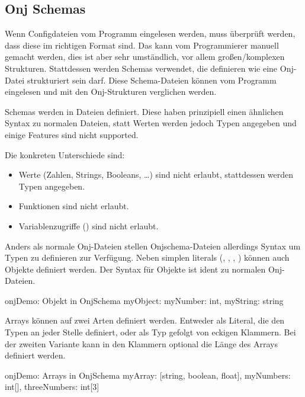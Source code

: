 
\subsection{Onj Schemas}\label{subsec:onj-schemas}

\renewcommand{\kapitelautor}{Autor: Marvin Kurka}

Wenn Configdateien vom Programm eingelesen werden, muss überprüft werden, dass diese im richtigen Format sind.
Das kann vom Programmierer manuell gemacht werden, dies ist aber sehr umständlich, vor allem großen/komplexen Strukturen.
Stattdessen werden Schemas verwendet, die definieren wie eine Onj-Datei strukturiert sein darf.
Diese Schema-Dateien können vom Programm eingelesen und mit den Onj-Strukturen verglichen werden.

Schemas werden in  Dateien definiert.
Diese haben prinzipiell einen ähnlichen Syntax zu normalen  Dateien, statt Werten werden jedoch
Typen angegeben und einige Features sind nicht supported.

Die konkreten Unterschiede sind:
\begin{itemize}
    \item Werte (\zB Zahlen, Strings, Booleans, \ldots) sind nicht erlaubt, stattdessen werden Typen angegeben.
    \item Funktionen sind nicht erlaubt.
    \item Variablenzugriffe () sind nicht erlaubt.
\end{itemize}

Anders als normale Onj-Dateien stellen Onjschema-Dateien allerdings Syntax um Typen zu definieren zur Verfügung.
Neben simplen literals (, , , ) können auch
Objekte definiert werden.
Der Syntax für Objekte ist ident zu normalen Onj-Dateien.

\begin{codeBlock}{onj}{Demo: Objekt in OnjSchema}
myObject: {
    myNumber: int,
    myString: string
}
\end{codeBlock}

Arrays können auf zwei Arten definiert werden.
Entweder als Literal, die den Typen an jeder Stelle definiert, oder als Typ gefolgt von eckigen Klammern.
Bei der zweiten Variante kann in den Klammern optional die Länge des Arrays definiert werden.

\begin{codeBlock}{onj}{Demo: Arrays in OnjSchema}
myArray: [string, boolean, float],
myNumbers: int[],
threeNumbers: int[3]
\end{codeBlock}

